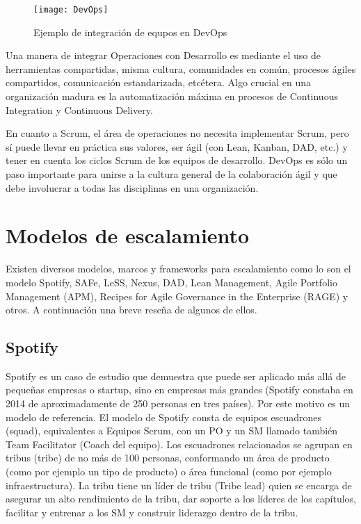 \begin{figure}[h]
  \centering
  \texttt{[image: DevOps]}
  \caption{Ejemplo de integración de equpos en DevOps}
  \centering
  \label{fig:DevOps} %
\end{figure}

Una manera de integrar Operaciones con Desarrollo es mediante el uso de herramientas compartidas, misma cultura, comunidades en común, procesos ágiles compartidos, comunicación estandarizada, etcétera. Algo crucial en una organización madura es la automatización máxima en procesos de Continuous Integration y Continuous Delivery.

En cuanto a Scrum, el área de operaciones no necesita implementar Scrum, pero sí puede llevar en práctica sus valores, ser ágil (con Lean, Kanban, DAD, etc.) y tener en cuenta los ciclos Scrum de los equipos de desarrollo. DevOps es sólo un paso importante para unirse a la cultura general de la colaboración ágil y que debe involucrar a todas las disciplinas en una organización. 


\section{Modelos de escalamiento}

Existen diversos modelos, marcos y frameworks para escalamiento como lo son el modelo Spotify, SAFe, LeSS, Nexus, DAD, Lean Management, Agile Portfolio Management (APM), Recipes for Agile Governance in the Enterprise (RAGE) y otros. A continuación una breve reseña de algunos de ellos.

\subsection{Spotify}

Spotify es un caso de estudio que demuestra que puede ser aplicado más allá de pequeñas empresas o startup, sino en empresas más grandes (Spotify constaba en 2014 de aproximadamente de 250 personas en tres países). Por este motivo es un modelo de referencia. El modelo de Spotify consta de equipos escuadrones (squad), equivalentes a Equipos Scrum, con un PO y un SM llamado también Team Facilitator (Coach del equipo). Los escuadrones relacionados se agrupan en tribus (tribe) de no más de 100 personas, conformando un área de producto (como por ejemplo un tipo de producto) o área funcional (como por ejemplo infraestructura). La tribu tiene un líder de tribu (Tribe lead) quien se encarga de asegurar un alto rendimiento de la tribu, dar soporte a los líderes de los capítulos, facilitar y entrenar a los SM y construir liderazgo dentro de la tribu. 

